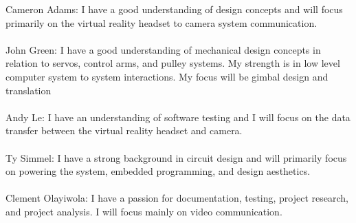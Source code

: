 Cameron Adams: I have a good understanding of design concepts and will focus primarily on the virtual reality headset to camera system communication.
\\\\
John Green: I have a good understanding of mechanical design concepts in relation to servos, control arms, and pulley systems. My strength is in low level computer system to system interactions. My focus will be gimbal design and translation
\\\\
Andy Le: I have an understanding of software testing and I will focus on the data transfer between the virtual reality headset and camera.
\\\\
Ty Simmel: I have a strong background in circuit design and will primarily focus on powering the system,  embedded programming,  and design aesthetics.
\\\\
Clement Olayiwola:   I have a passion for documentation, testing, project research, and project analysis. I will focus mainly on video communication.
\\\\